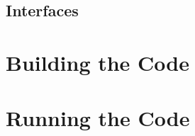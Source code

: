 \subsection{Interfaces}
\label{sub:interfaces}

\appendix
\section{Building the Code}
\label{sec:building_the_code}

\section{Running the Code}
\label{sec:running_the_code}

\nocite{*}



